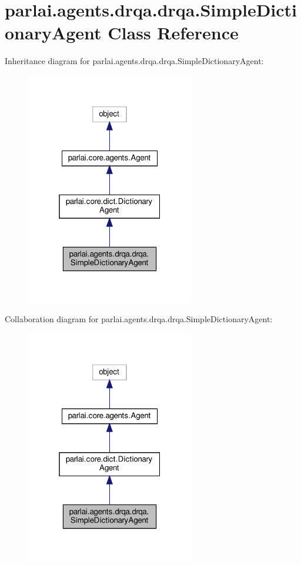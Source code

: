 \hypertarget{classparlai_1_1agents_1_1drqa_1_1drqa_1_1SimpleDictionaryAgent}{}\section{parlai.\+agents.\+drqa.\+drqa.\+Simple\+Dictionary\+Agent Class Reference}
\label{classparlai_1_1agents_1_1drqa_1_1drqa_1_1SimpleDictionaryAgent}


Inheritance diagram for parlai.\+agents.\+drqa.\+drqa.\+Simple\+Dictionary\+Agent\+:\nopagebreak
\begin{figure}[H]
\begin{center}
\leavevmode
\includegraphics[width=208pt]{dc/dbf/classparlai_1_1agents_1_1drqa_1_1drqa_1_1SimpleDictionaryAgent__inherit__graph}
\end{center}
\end{figure}


Collaboration diagram for parlai.\+agents.\+drqa.\+drqa.\+Simple\+Dictionary\+Agent\+:
\nopagebreak
\begin{figure}[H]
\begin{center}
\leavevmode
\includegraphics[width=208pt]{d0/df5/classparlai_1_1agents_1_1drqa_1_1drqa_1_1SimpleDictionaryAgent__coll__graph}
\end{center}
\end{figure}
